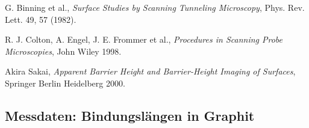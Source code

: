\documentclass[10pt, a4paper]{article}
\begin{document}
\begin{thebibliography}{9}

  G. Binning et al.,
  \emph{Surface Studies by Scanning Tunneling Microscopy},
  Phys. Rev. Lett. 49, 57 (1982).

  R. J. Colton, A. Engel, J. E. Frommer et al.,
  \emph{Procedures in Scanning Probe Microscopies},
  John Wiley 1998.

  Akira Sakai,
  \emph{Apparent Barrier Height and Barrier-Height Imaging of Surfaces},
  Springer Berlin Heidelberg 2000.
  
\end{thebibliography}

\newpage

\begin{appendix}
\section{Messdaten: Bindungslängen in Graphit}
\label{messw:laenge}


\end{appendix}
\end{document}
